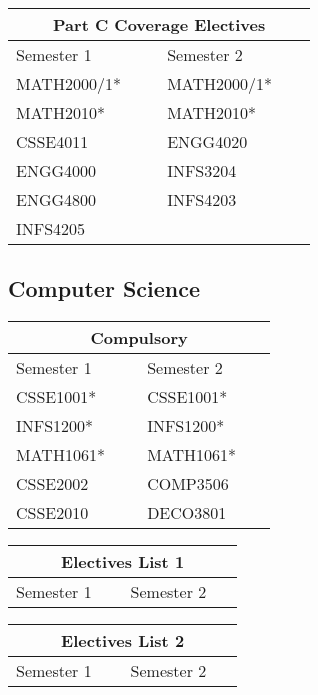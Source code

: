 \begin{center}
	\begin{tabular}{p{0.4\linewidth} | p{0.4\linewidth}}
		\multicolumn{2}{c}{\textbf{Part C Coverage Electives}} \\ \midrule
		Semester 1 & Semester 2 \\ \midrule
		MATH2000/1*	&	MATH2000/1* \\
		MATH2010*	&	MATH2010* \\
		CSSE4011	&	ENGG4020 \\
		ENGG4000	&	INFS3204 \\
		ENGG4800	&	INFS4203 \\
		INFS4205	&	 \\
		\bottomrule
	\end{tabular}
\end{center}

\subsection{Computer Science}
\begin{center}
	\begin{tabular}{p{0.4\linewidth} | p{0.4\linewidth}}
		\multicolumn{2}{c}{\textbf{Compulsory}} \\ \midrule
		Semester 1 & Semester 2 \\ \midrule
		CSSE1001*	&	CSSE1001* \\
		INFS1200*	&	INFS1200* \\
		MATH1061*	&	MATH1061* \\
		CSSE2002	&	COMP3506 \\
		CSSE2010	&	DECO3801 \\
		\bottomrule
	\end{tabular}
\end{center}
\begin{center}
	\begin{tabular}{p{0.4\linewidth} | p{0.4\linewidth}}
		\multicolumn{2}{c}{\textbf{Electives List 1}} \\ \midrule
		Semester 1 & Semester 2 \\ \midrule
		
		\bottomrule
	\end{tabular}
\end{center}
\begin{center}
	\begin{tabular}{p{0.4\linewidth} | p{0.4\linewidth}}
		\multicolumn{2}{c}{\textbf{Electives List 2}} \\ \midrule
		Semester 1 & Semester 2 \\ \midrule
		
		\bottomrule
	\end{tabular}
\end{center}